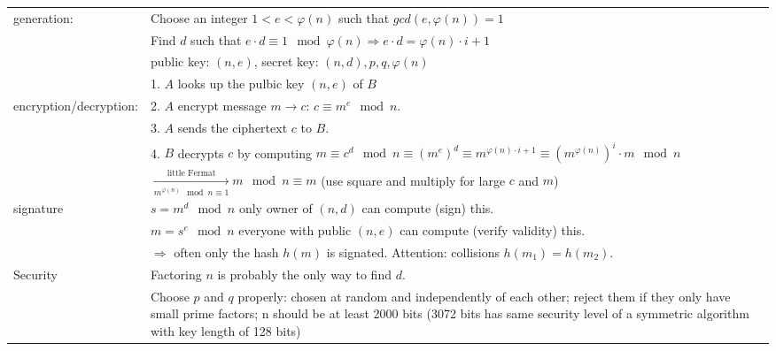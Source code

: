 \begin{tabular}{|l| p{14.7cm}|}
	generation:						&	Choose an integer $1<e<\varphi(n)$ such that $gcd(e,\varphi(n))=1$\\
									&	Find $d$ such that $e\cdot d\equiv 1 \mod \varphi(n) \Rightarrow e\cdot d = \varphi(n) \cdot i + 1$\\
									&	public key: $(n,e)$, secret key: $(n,d), p,q, \varphi(n)$\\
									\cline{2-2}
									&	1. $A$ looks up the pulbic key $(n,e)$ of $B$\\
	encryption/decryption:			&	2. $A$ encrypt message $m \to c$: $c \equiv m^e \mod n$.\\
									&	3. $A$ sends the ciphertext $c$ to $B$.\\
									&	4. $B$ decrypts $c$ by computing $m\equiv c^d \mod n \equiv (m^{e})^d \equiv  m^{\varphi(n) \cdot i + 1} \equiv  \left(m^{\varphi(n)}\right)^i \cdot m \mod n$\\
									&	$\xrightarrow[m^{\varphi(n)} \mod n\equiv 1]{\text{little Fermat}} m \mod n \equiv m $  (use square and multiply for large $c$ and $m$)\\
									\cline{2-2}
	signature						&	$s=m^d \mod n$ only owner of $(n,d)$ can compute (sign) this.\\
									&	$m=s^e \mod n$ everyone with public $(n,e)$ can compute (verify validity) this.\\
									&	$\Rightarrow$ often only the hash $h(m)$ is signated. Attention: 
										collisions $h(m_1)=h(m_2)$.\\
									\cline{2-2}
	Security        & Factoring $n$ is probably the only way to find $d$.\\
									& Choose $p$ and $q$ properly: chosen at random and independently of each other; reject them if they only have small prime factors; n should be at least 2000 bits (3072 bits has same security level of a symmetric algorithm with key length of 128 bits)\\
	\hline 
\end{tabular}